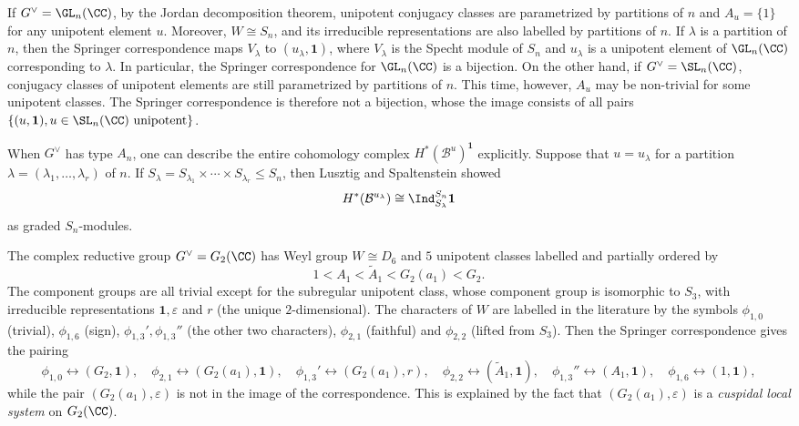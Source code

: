 \begin{example}
    If $G^\vee=\GL_n(\CC)$, by the Jordan decomposition theorem, unipotent conjugacy classes are parametrized by partitions of $n$ and $A_u=\{1\}$ for any unipotent element $u$. Moreover, $W\cong S_n$, and its irreducible representations are also labelled by partitions of $n$. If $\lambda$ is a partition of $n$, then the Springer correspondence maps $V_\lambda$ to $(u_\lambda,\mathbf{1})$, where $V_\lambda$ is the Specht module of $S_n$ and $u_\lambda$ is a unipotent element of $\GL_n(\CC)$ corresponding to $\lambda$. In particular, the Springer correspondence for $\GL_n(\CC)$ is a bijection. On the other hand, if $G^\vee=\SL_n(\CC)$, conjugacy classes of unipotent elements are still parametrized by partitions of $n$. This time, however, $A_u$ may be non-trivial for some unipotent classes. The Springer correspondence is therefore not a bijection, whose the image consists of all pairs $\{(u,\mathbf{1}), u\in\SL_n(\CC)\textrm{ unipotent}\}$.

    When $G^\vee$ has type $A_n$, one can describe the entire cohomology complex $H^*(\mathcal{B}^u)^\mathbf{1}$ explicitly. Suppose that $u=u_\lambda$ for a partition $\lambda=(\lambda_1,\ldots,\lambda_r)$ of $n$. If $S_\lambda=S_{\lambda_1}\times\cdots\times S_{\lambda_r}\leq S_n$, then Lusztig and Spaltenstein showed
    $$H^*(\mathcal{B}^{u_\lambda})\cong\Ind_{S_\lambda}^{S_n}\mathbf{1}$$
    as graded $S_n$-modules.
\end{example}

\begin{example}
    The complex reductive group $G^\vee=G_2(\CC)$ has Weyl group $W\cong D_6$ and $5$ unipotent classes labelled and partially ordered by 
    $$1<A_1<\tilde{A}_1<G_2(a_1)<G_2.$$
    The component groups are all trivial except for the subregular unipotent class, whose component group is isomorphic to $S_3$, with irreducible representations $\mathbf{1},\varepsilon$ and $r$ (the unique $2$-dimensional).
    The characters of $W$ are labelled in the literature by the symbols $\phi_{1,0}$ (trivial), $\phi_{1,6}$ (sign), $\phi_{1,3}',\phi_{1,3}''$ (the other two characters), $\phi_{2,1}$ (faithful) and $\phi_{2,2}$ (lifted from $S_3$). Then the Springer correspondence gives the pairing 
    $$\phi_{1,0}\leftrightarrow(G_2,\mathbf{1}),\quad\phi_{2,1}\leftrightarrow(G_2(a_1),\mathbf{1}),\quad\phi_{1,3}'\leftrightarrow(G_2(a_1),r),\quad\phi_{2,2}\leftrightarrow(\tilde{A}_1,\mathbf{1}),\quad\phi_{1,3}''\leftrightarrow(A_1,\mathbf{1}),\quad\phi_{1,6}\leftrightarrow(1,\mathbf{1}),$$
    while the pair $(G_2(a_1),\varepsilon)$ is not in the image of the correspondence. This is explained by the fact that $(G_2(a_1),\varepsilon)$ is a \textit{cuspidal local system} on $G_2(\CC)$.
\end{example}

